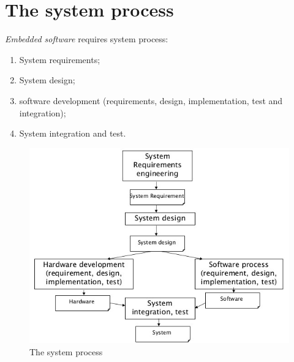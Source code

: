 \section{The system process}
\emph{Embedded software} requires system process:

\begin{enumerate}
\item System requirements;
\item System design;
\item software development (requirements, design, implementation, test and integration);
\item System integration and test.
\end{enumerate}

\begin{figure}[hbtp]
\centering
\includegraphics[scale=0.4]{images/system_process.jpg}
\caption{The system process}
\end{figure}